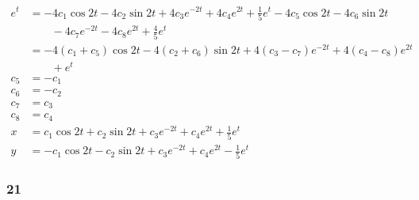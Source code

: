 \documentclass{article}
\begin{document}
\begin{align*}
  e^t & = -4 c_1 \cos 2 t - 4 c_2 \sin 2 t + 4 c_3 e^{-2 t} + 4 c_4 e^{2 t} + \frac{1}{5} e^t - 4 c_5 \cos 2 t - 4 c_6 \sin 2 t \\
      & \qquad - 4 c_7 e^{-2 t} - 4 c_8 e^{2 t} + \frac{4}{5} e^t                                                               \\
      & = -4 (c_1 + c_5) \cos 2 t - 4 (c_2 + c_6) \sin 2 t + 4 (c_3 - c_7) e^{-2 t} + 4 (c_4 - c_8) e^{2 t}                     \\
      & \qquad + e^t                                                                                                            \\
  c_5 & = -c_1                                                                                                                  \\
  c_6 & = -c_2                                                                                                                  \\
  c_7 & = c_3                                                                                                                   \\
  c_8 & = c_4                                                                                                                   \\
  x   & = c_1 \cos 2 t + c_2 \sin 2 t + c_3 e^{-2 t} + c_4 e^{2 t} + \frac{1}{5} e^t                                            \\
  y   & = -c_1 \cos 2 t - c_2 \sin 2 t + c_3 e^{-2 t} + c_4 e^{2 t} - \frac{1}{5} e^t
\end{align*}

\subsubsection{21}
\end{document}

